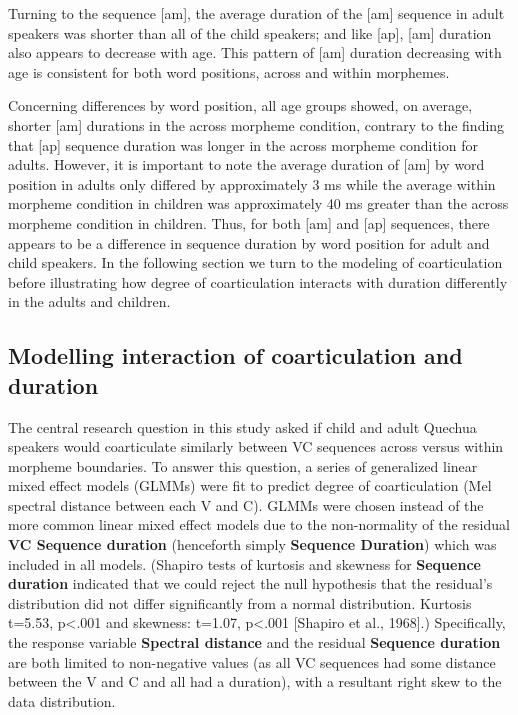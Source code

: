 \documentclass[
]{article}
\begin{document}
Turning to the sequence {[}am{]}, the average duration of the {[}am{]} sequence in adult speakers was shorter than all of the child speakers; and like {[}ap{]}, {[}am{]} duration also appears to decrease with age. This pattern of {[}am{]} duration decreasing with age is consistent for both word positions, across and within morphemes.

Concerning differences by word position, all age groups showed, on average, shorter {[}am{]} durations in the across morpheme condition, contrary to the finding that {[}ap{]} sequence duration was longer in the across morpheme condition for adults. However, it is important to note the average duration of {[}am{]} by word position in adults only differed by approximately 3 ms while the average within morpheme condition in children was approximately 40 ms greater than the across morpheme condition in children. Thus, for both {[}am{]} and {[}ap{]} sequences, there appears to be a difference in sequence duration by word position for adult and child speakers. In the following section we turn to the modeling of coarticulation before illustrating how degree of coarticulation interacts with duration differently in the adults and children.

\hypertarget{modelling-interaction-of-coarticulation-and-duration}{%
\subsection{Modelling interaction of coarticulation and duration}\label{modelling-interaction-of-coarticulation-and-duration}}

The central research question in this study asked if child and adult Quechua speakers would coarticulate similarly between VC sequences across versus within morpheme boundaries. To answer this question, a series of generalized linear mixed effect models (GLMMs) were fit to predict degree of coarticulation (Mel spectral distance between each V and C). GLMMs were chosen instead of the more common linear mixed effect models due to the non-normality of the residual \textbf{VC Sequence duration} (henceforth simply \textbf{Sequence Duration}) which was included in all models. (Shapiro tests of kurtosis and skewness for \textbf{Sequence duration} indicated that we could reject the null hypothesis that the residual's distribution did not differ significantly from a normal distribution. Kurtosis t=5.53, p\textless.001 and skewness: t=1.07, p\textless.001 {[}Shapiro et al., 1968{]}.) Specifically, the response variable \textbf{Spectral distance} and the residual \textbf{Sequence duration} are both limited to non-negative values (as all VC sequences had some distance between the V and C and all had a duration), with a resultant right skew to the data distribution.
\end{document}
